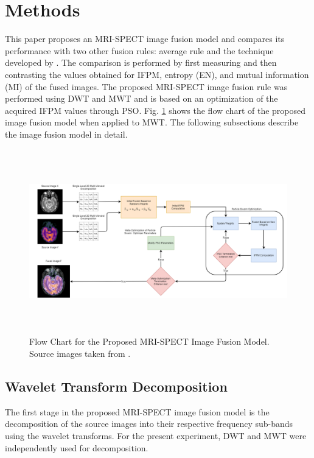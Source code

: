 \documentclass{article}
\begin{document}
\section{Methods}
\label{sec: method}
This paper proposes an MRI-SPECT image fusion model and compares its performance with two other fusion rules: average rule and the technique developed by \cite{Wang2004}. The comparison is performed by first measuring and then contrasting the values obtained for IFPM, entropy (EN), and mutual information (MI) of the fused images. The proposed MRI-SPECT image fusion rule was performed using DWT and MWT and is based on an optimization of the acquired IFPM values through PSO. Fig. \ref{framework} shows the flow chart of the proposed image fusion model when applied to MWT. The following subsections describe the image fusion model in detail.


\begin{figure}[tb]
    \centering
    \includegraphics[height=8cm]{Img/Methodology.png}
    \caption{Flow Chart for the Proposed MRI-SPECT Image Fusion Model. Source images taken from \cite{HarvardBrain}.}
    \label{framework}
\end{figure}
    
\subsection{Wavelet Transform Decomposition}
The first stage in the proposed MRI-SPECT image fusion model is the decomposition of the source images into their respective frequency sub-bands using the wavelet transforms. For the present experiment, DWT and MWT were independently used for decomposition.
\end{document}
